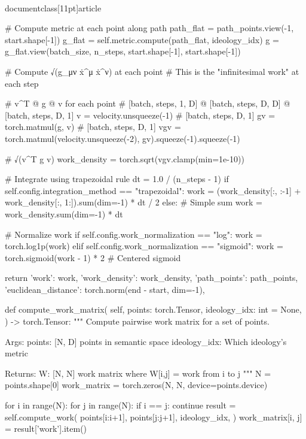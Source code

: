 \\documentclass[11pt]{article}
\begin{document}
\begin{CodeBlock}
        # Compute metric at each point along path
        path_flat = path_points.view(-1, start.shape[-1])
        g_flat = self.metric.compute(path_flat, ideology_idx)
        g = g_flat.view(batch_size, n_steps, start.shape[-1], start.shape[-1])

        # Compute √(g_μν ẋ^μ ẋ^ν) at each point
        # This is the "infinitesimal work" at each step

        # v^T @ g @ v for each point
        # [batch, steps, 1, D] @ [batch, steps, D, D] @ [batch, steps, D, 1]
        v = velocity.unsqueeze(-1)  # [batch, steps, D, 1]
        gv = torch.matmul(g, v)     # [batch, steps, D, 1]
        vgv = torch.matmul(velocity.unsqueeze(-2), gv).squeeze(-1).squeeze(-1)

        # √(v^T g v)
        work_density = torch.sqrt(vgv.clamp(min=1e-10))

        # Integrate using trapezoidal rule
        dt = 1.0 / (n_steps - 1)
        if self.config.integration_method == "trapezoidal":
            work = (work_density[:, :-1] + work_density[:, 1:]).sum(dim=-1) * dt / 2
        else:  # Simple sum
            work = work_density.sum(dim=-1) * dt

        # Normalize work
        if self.config.work_normalization == "log":
            work = torch.log1p(work)
        elif self.config.work_normalization == "sigmoid":
            work = torch.sigmoid(work - 1) * 2  # Centered sigmoid

        return {
            'work': work,
            'work_density': work_density,
            'path_points': path_points,
            'euclidean_distance': torch.norm(end - start, dim=-1),
        }

    def compute_work_matrix(
        self,
        points: torch.Tensor,
        ideology_idx: int = None,
    ) -> torch.Tensor:
        """
        Compute pairwise work matrix for a set of points.

        Args:
            points: [N, D] points in semantic space
            ideology_idx: Which ideology's metric

        Returns:
            W: [N, N] work matrix where W[i,j] = work from i to j
        """
        N = points.shape[0]
        work_matrix = torch.zeros(N, N, device=points.device)

        for i in range(N):
            for j in range(N):
                if i == j:
                    continue
                result = self.compute_work(
                    points[i:i+1],
                    points[j:j+1],
                    ideology_idx,
                )
                work_matrix[i, j] = result['work'].item()


\end{CodeBlock}
\end{document}
